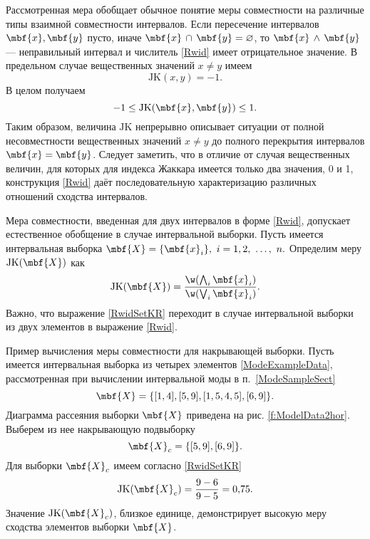 \documentclass[a5paper,openany]{book}
\begin{document}
Рассмотренная мера обобщает обычное понятие меры совместности на различные типы взаимной совместности интервалов. 
Если пересечение интервалов $\mbf{x}, \mbf{y} $ пусто, иначе $\mbf{x} \, \cap \, \mbf{y} = \varnothing$, то $\mbf{x} \, \wedge \, \mbf{y}$ --- неправильный интервал и числитель \eqref{Rwid} имеет отрицательное значение. 
В предельном случае вещественных значений $x \neq y$ имеем
\begin{equation*}
\mathrm{JK}(x, y) =-1.
\end{equation*}
В целом получаем
\begin{equation}\label{Rwidrange}
-1 \leq \mathrm{JK}(\mbf{x}, \mbf{y}) \leq 1.
\end{equation}
Таким образом, величина $\mathrm{JK}$  непрерывно описывает ситуации от полной несовместности вещественных значений $x \neq y$ до полного перекрытия интервалов $\mbf{x} = \mbf{y}$.
Следует заметить, что в отличие от случая вещественных величин, для которых для  индекса Жаккара имеется только два значения, 0 и 1, конструкция \eqref{Rwid} даёт последовательную характеризацию различных отношений сходства интервалов.

Мера совместности, введенная  для двух интервалов  в форме \eqref{Rwid}, допускает естественное обобщение в случае интервальной выборки. 
Пусть имеется интервальная выборка  $\mbf{X} = \{ \mbf{x}_i \}, \ i=1,2, \ \ldots, \ n.$
Определим меру $\mathrm{JK}(\mbf{X}) $ как 
\begin{align} 
\mathrm{JK}(\mbf{X}) = 
\frac{\w (\bigwedge_i \mbf{x}_i )}{\w (\bigvee_i \mbf{x}_i)}. \label{RwidSetKR}
\end{align}
Важно, что выражение \eqref{RwidSetKR} переходит в случае интервальной выборки из двух элементов в выражение \eqref{Rwid}. %

\begin{example}{Пример вычисления меры совместности для накрывающей выборки.}
Пусть имеется интервальная выборка из четырех элементов \eqref{ModeExampleData}, рассмотренная при вычислении интервальной моды в п.~\ref{ModeSampleSect}
\begin{equation*}
	\mbf{X}   = \{ 
	[1, 4],  [5, 9],  [1,5, 4,5],   [6, 9]   \}.
\end{equation*}	
Диаграмма рассеяния выборки $\mbf{X}$ приведена на рис. \ref{f:ModelData2hor}.
Выберем из нее накрывающую подвыборку
\begin{equation*}
	\mbf{X}_{c}   = \{  
	[5, 9],   [6, 9]  \}.
\end{equation*}	
Для выборки $\mbf{X}_{c}$  имеем согласно \eqref{RwidSetKR}
\begin{equation*}
	\mathrm{JK}(\mbf{X}_{c}) = \frac{9-6}{9-5} = 0,\!75.
\end{equation*}
Значение $\mathrm{JK}(\mbf{X}_{c})$, близкое единице, демонстрирует высокую меру сходства элементов выборки $\mbf{X}$.	
\end{example}
\end{document}
